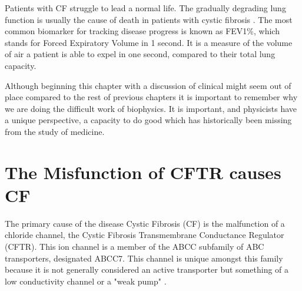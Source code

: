 Patients with CF struggle to lead a normal life. The gradually degrading lung function is usually the cause of death in patients with cystic fibrosis \cite{kumar2018}. The most common biomarker for tracking disease progress is known as FEV1\%, which stands for Forced Expiratory Volume in 1 second. It is a measure of the volume of air a patient is able to expel in one second, compared to their total lung capacity.

Although beginning this chapter with a discussion of clinical might seem out of place compared to the rest of previous chapters it is important to remember why we are doing the difficult work of biophysics. It is important, and physicists have a unique perspective, a capacity to do good which has historically been missing from the study of medicine. 

\section{The Misfunction of CFTR causes CF}

The primary cause of the disease Cystic Fibrosis (CF) is the malfunction of a chloride channel, the Cystic Fibrosis Transmembrane Conductance Regulator (CFTR). This ion channel is a member of the ABCC subfamily of ABC transporters, designated ABCC7. This channel is unique amongst this family because it is not generally considered an active transporter but something of a low conductivity channel or a "weak pump" \cite{linsdell2018}.

